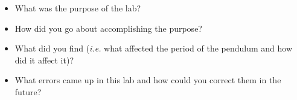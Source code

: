 \documentclass[10pt]{exam}
\begin{document}
  \begin{itemize}
    \item
      What was the purpose of the lab?
    \item
      How did you go about accomplishing the purpose?
    \item
      What did you find (\emph{i.e.} what affected the period of the
      pendulum and how did it affect it)?
    \item
      What errors came up in this lab and how could you correct them in the
      future?
  \end{itemize}
\end{document}
